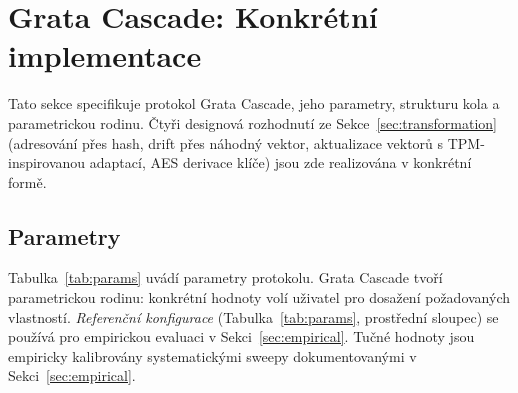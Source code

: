 \documentclass[11pt,a4paper]{article}
\begin{document}
\section{Grata Cascade: Konkrétní implementace}\label{sec:concrete}

Tato sekce specifikuje protokol Grata Cascade, jeho parametry, strukturu kola a parametrickou rodinu. Čtyři designová rozhodnutí ze Sekce~\ref{sec:transformation} (adresování přes hash, drift přes náhodný vektor, aktualizace vektorů s TPM-inspirovanou adaptací, AES derivace klíče) jsou zde realizována v konkrétní formě.

\subsection{Parametry}

Tabulka~\ref{tab:params} uvádí parametry protokolu. Grata Cascade tvoří parametrickou rodinu: konkrétní hodnoty volí uživatel pro dosažení požadovaných vlastností. \emph{Referenční konfigurace} (Tabulka~\ref{tab:params}, prostřední sloupec) se používá pro empirickou evaluaci v Sekci~\ref{sec:empirical}. Tučné hodnoty jsou empiricky kalibrovány systematickými sweepy dokumentovanými v Sekci~\ref{sec:empirical}.
\end{document}
